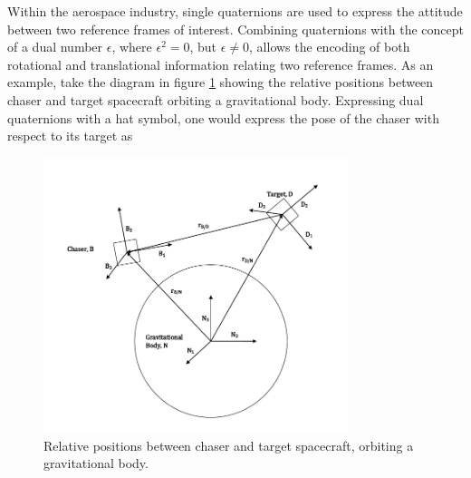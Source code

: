 \documentclass[letterpaper, preprint, paper,11pt]{AAS}	%
\begin{document}
Within the aerospace industry, single quaternions are used to express the attitude between two reference frames of interest. Combining quaternions with the concept of a dual number $\epsilon$, where $\epsilon^2 = 0$, but $\epsilon \ne 0$, allows the encoding of both rotational and translational information relating two reference frames. As an example, take the diagram in figure \ref{fig:Rel_Pos} showing the relative positions between chaser and target spacecraft orbiting a gravitational body. Expressing dual quaternions with a hat symbol, one would express the pose of the chaser with respect to its target as

\begin{figure}[h!]
	\centering\includegraphics[width=3.5in]{Figures/REL_POSE.pdf}
	\caption{Relative positions between chaser and target spacecraft, orbiting a gravitational body.}
	\label{fig:Rel_Pos}
\end{figure}
\end{document}
